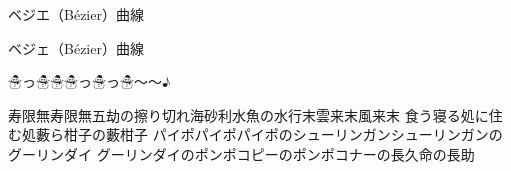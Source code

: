 \documentclass{article}
\begin{document}
ベジエ（Bézier）曲線\par
ベジェ（Bézier）曲線\par
☃っ☃☃☃っ☃っ☃～～♪\par
\bigskip
\parbox{21\zw}{%
寿限無寿限無五劫の擦り切れ海砂利水魚の水行末雲来末風来末%
食う寝る処に住む処藪ら柑子の藪柑子%
パイポパイポパイポのシューリンガンシューリンガンのグーリンダイ%
グーリンダイのポンポコピーのポンポコナーの長久命の長助%
}
\end{document}
